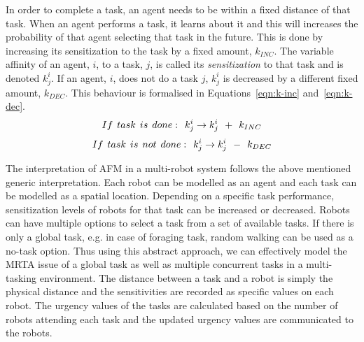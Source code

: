 \documentclass[smallcondensed]{svjour3}
\begin{document}
In order to complete a task, an agent needs to be within a fixed distance of that task.  When an agent performs a task, it learns about it and this will increases the probability of that agent selecting that task in the future.  This is done by increasing its sensitization to the task by a fixed amount, $k_{INC}$. The variable affinity of an agent, $i$, to a task, $j$, is called its {\em sensitization} to that task and is denoted $k^{i}_{j}$.  If an agent, $i$, does not do a task $j$, $k^i_j$ is decreased by a different fixed amount, $k_{DEC}$.  This behaviour is formalised in Equations~\ref{eqn:k-inc} and~\ref{eqn:k-dec}.
\begin{equation}
 If\hspace*{0.15cm}task\hspace*{0.15cm}is\hspace*{0.15cm}done:\hspace*{0.15cm}  k^i_j \rightarrow   k^i_j \hspace*{0.15cm} + \hspace*{0.15cm} k_{INC}
\label{eqn:k-inc}
\end{equation}
\begin{equation}
 If\hspace*{0.15cm}task\hspace*{0.15cm}is\hspace*{0.15cm}not\hspace*{0.15cm}done:\hspace*{0.15cm}  k^i_j \rightarrow   k^i_j \hspace*{0.15cm} - \hspace*{0.15cm} k_{DEC}
\label{eqn:k-dec}
\end{equation}

The interpretation of AFM in a multi-robot system follows the above mentioned generic interpretation. Each robot can be modelled as an agent and each task can be modelled as a spatial location. Depending on a specific task performance, sensitization levels of robots for that task can be increased or decreased. Robots can have multiple options to select a task from a set of available tasks. If there is only a global task, e.g. in case of foraging task, random walking can be used as a no-task option. Thus using this abstract approach, we can effectively model the MRTA issue of a global task as well as multiple concurrent tasks in a multi-tasking environment. The distance between a task and a robot is simply the physical distance and the sensitivities are recorded as specific values on each robot. The urgency values of the tasks are calculated based on the number of robots attending each task and the updated urgency values are communicated to the robots.
\end{document}
